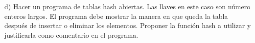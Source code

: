 {\color[rgb]{1,0,0}
d) Hacer un programa de tablas hash abiertas. Las llaves
en este caso son número enteros largos. El programa debe
mostrar la manera en que queda la tabla después de insertar
o eliminar los elementos. Proponer la función hash a utilizar
y justificarla como comentario en el programa.
}